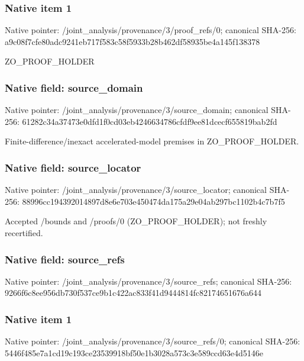 \documentclass[10pt,a4paper]{article}
\begin{document}
\subsubsection{Native item 1}
Native pointer: /joint\_\allowbreak{}analysis/provenance/3/proof\_\allowbreak{}refs/0; canonical SHA-256: a9c08f7cfe80adc9241eb717f583c58f5933b28b462df58935be4a145f138378

\begingroup\raggedright\sloppy ZO\_\allowbreak{}PROOF\_\allowbreak{}HOLDER\par\endgroup

\subsubsection{Native field: source\_\allowbreak{}domain}
Native pointer: /joint\_\allowbreak{}analysis/provenance/3/source\_\allowbreak{}domain; canonical SHA-256: 61282c34a37473e0dfd1f0cd03eb4246634786cfdf9ee81dcecf655819bab2fd

\begingroup\raggedright\sloppy Finite-difference/\allowbreak{}inexact accelerated-model premises in ZO\_\allowbreak{}PROOF\_\allowbreak{}HOLDER.\par\endgroup

\subsubsection{Native field: source\_\allowbreak{}locator}
Native pointer: /joint\_\allowbreak{}analysis/provenance/3/source\_\allowbreak{}locator; canonical SHA-256: 88996cc194392014897d8e6e703e450474da175a29e04ab297bc1102b4c7b7f5

\begingroup\raggedright\sloppy Accepted /\allowbreak{}bounds and /\allowbreak{}proofs/\allowbreak{}0 (ZO\_\allowbreak{}PROOF\_\allowbreak{}HOLDER);\allowbreak{} not freshly recertified.\par\endgroup

\subsubsection{Native field: source\_\allowbreak{}refs}
Native pointer: /joint\_\allowbreak{}analysis/provenance/3/source\_\allowbreak{}refs; canonical SHA-256: 9266f6c8ee956db730f537ce9b1c422ac833f41d9444814fc82174651676a644

\subsubsection{Native item 1}
Native pointer: /joint\_\allowbreak{}analysis/provenance/3/source\_\allowbreak{}refs/0; canonical SHA-256: 5446f485e7a1cd19c193ce23539918bf50e1b3028a573c3e589ccd63e4d5146e
\end{document}
